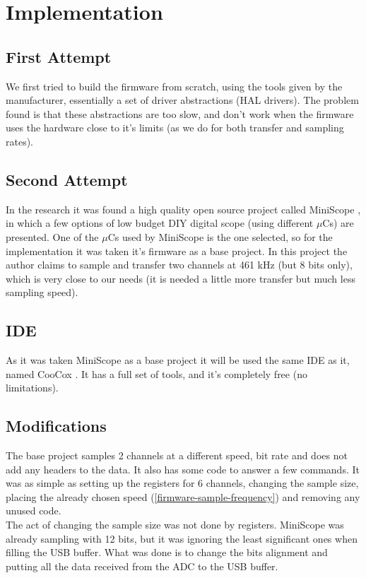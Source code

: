 \section{Implementation}
\label{firmware-implementation}

\subsection{First Attempt}
We first tried to build the firmware from scratch, using the tools given by the
manufacturer, essentially a set of driver abstractions (HAL drivers). The problem
found is that these abstractions are too slow, and don't work when the firmware
uses the hardware close to it's limits (as we do for both transfer and sampling rates).

\subsection{Second Attempt}
In the research it was found a high quality open source project called MiniScope \cite{MiniScope},
in which a few options of low budget DIY digital scope (using different $\mu$Cs) are
presented. One of the $\mu$Cs used by MiniScope is the one selected, so for the
implementation it was taken it's firmware as a base project. In this project the author
claims to sample and transfer two channels at 461 kHz (but 8 bits only), which is
very close to our needs (it is needed a little more transfer but much less sampling speed).

\subsection{IDE}
As it was taken MiniScope as a base project it will be used the same IDE as it, named
CooCox \cite{CooCox}. It has a full set of tools, and it's completely free (no limitations).

\subsection{Modifications}
The base project samples 2 channels at a different speed, bit rate and does not
add any headers to the data. It also has some code to answer a few commands. It
was as simple as setting up the registers for 6 channels, changing the sample size,
placing the already chosen speed (\autoref{firmware-sample-frequency}) and removing
any unused code. \\
The act of changing the sample size was not done by registers. MiniScope was already
sampling with 12 bits, but it was ignoring the least significant ones when filling
the USB buffer. What was done is to change the bits alignment and putting all
the data received from the ADC to the USB buffer.

